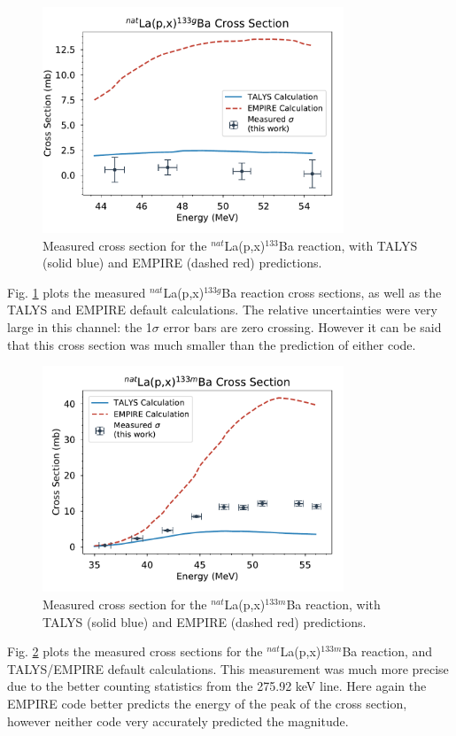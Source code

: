 \documentclass[aps,twocolumn,secnumarabic,balancelastpage,amsmath,amssymb,nofootinbib,floatfix]{revtex4-1}
\begin{document}
\begin{figure}[htb]
\includegraphics[width=9cm]{cross_sections/133BAg}
\caption{Measured cross section for the $^{nat}$La(p,x)$^{133}$Ba reaction, with TALYS (solid blue) and EMPIRE (dashed red) predictions.
}
\label{fig:133BAg}
\end{figure}

Fig. \ref{fig:133BAg} plots the measured $^{nat}$La(p,x)$^{133g}$Ba reaction cross sections, as well as the TALYS and EMPIRE default calculations.  The relative uncertainties were very large in this channel: the 1$\sigma$ error bars are zero crossing.  However it can be said that this cross section was much smaller than the prediction of either code.

\begin{figure}[htb]
\includegraphics[width=9cm]{cross_sections/133BAm}
\caption{Measured cross section for the $^{nat}$La(p,x)$^{133m}$Ba reaction, with TALYS (solid blue) and EMPIRE (dashed red) predictions.
}
\label{fig:133BAm}
\end{figure}

Fig. \ref{fig:133BAm} plots the measured cross sections for the $^{nat}$La(p,x)$^{133m}$Ba reaction, and TALYS/EMPIRE default calculations.  This measurement was much more precise due to the better counting statistics from the 275.92 keV line.  Here again the EMPIRE code better predicts the energy of the peak of the cross section, however neither code very accurately predicted the magnitude.
\end{document}
